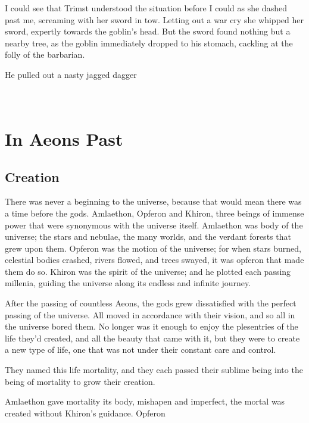 \documentclass[12pt, a4paper]{book}
\begin{document}
I could see that Trimst understood the situation before I could as she dashed past me, screaming with her sword in tow. Letting out a war cry she whipped her sword, expertly towards the goblin's head. But the sword found nothing but a nearby tree, as the goblin immediately dropped to his stomach, cackling at the folly of the barbarian.

He pulled out a nasty jagged dagger 

\part*{
\setlength{\fboxsep}{3pt}%
\setlength{\fboxrule}{3pt}%
~\\[1cm]
In Aeons Past
}
\setcounter{chapter}{0}

\chapter{Creation}
There was never a beginning to the universe, because that would mean there was a time before the gods. Amlaethon, Opferon and Khiron, three beings of immense power that were synonymous with the universe itself. Amlaethon was body of the universe; the stars and nebulae, the many worlds, and the verdant forests that grew upon them. Opferon was the motion of the universe; for when stars burned, celestial bodies crashed, rivers flowed, and trees swayed, it was opferon that made them do so. Khiron was the spirit of the universe; and he plotted each passing millenia, guiding the universe along its endless and infinite journey.

After the passing of countless Aeons, the gods grew dissatisfied with the perfect passing of the universe. All moved in accordance with their vision, and so all in the universe bored them. No longer was it enough to enjoy the plesentries of the life they'd created, and all the beauty that came with it, but they were to create a new type of life, one that was not under their constant care and control.

They named this life mortality, and they each passed their sublime being into the being of mortality to grow their creation.

Amlaethon gave mortality its body, mishapen and imperfect, the mortal was created without Khiron's guidance. Opferon 
\end{document}
